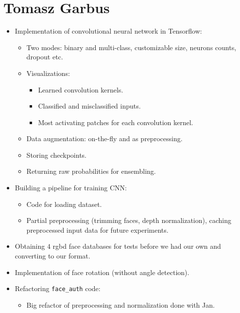     \section{Tomasz Garbus}
        \begin{itemize}
            \item Implementation of convolutional neural network in Tensorflow:
            \begin{itemize}
                \item Two modes: binary and multi-class, customizable size, neurons
                      counts, dropout etc.
                \item Visualizations:
                    \begin{itemize}
                        \item Learned convolution kernels.
                        \item Classified and misclassified inputs.
                        \item Most activating patches for each convolution kernel.
                    \end{itemize}
                \item Data augmentation: on-the-fly and as preprocessing.
                \item Storing checkpoints.
                \item Returning raw probabilities for ensembling.
            \end{itemize}
            \item Building a pipeline for training CNN:
            \begin{itemize}
                \item Code for loading dataset.
                \item Partial preprocessing (trimming faces, depth normalization),
                      caching preprocessed input data for future experiments.
            \end{itemize}
            \item Obtaining $4$ rgbd face databases for tests before we had our own and
                  converting to our format.
            \item Implementation of face rotation (without angle detection).
            \item Refactoring \texttt{face\_auth} code:
            \begin{itemize}
                \item Big refactor of preprocessing and normalization done with Jan.

\end{itemize}
\end{itemize}

